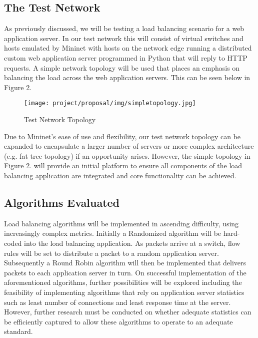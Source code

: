 \subsection{The Test Network}
As previously discussed, we will be testing a load balancing scenario for a web application server. In our test network this will consist of virtual switches and hosts emulated by Mininet with hosts on the network edge running a distributed custom web application server programmed in Python that will reply to HTTP requests. A simple network topology will be used that places an emphasis on balancing the load across the web application servers. This can be seen below in Figure 2.

\begin{figure}[H]
    \centering
    \texttt{[image: project/proposal/img/simpletopology.jpg]} \\[0.2cm]
    \caption{Test Network Topology}
    \label{fig:topology}
\end{figure}

Due to Mininet's ease of use and flexibility, our test network topology can be expanded to encapsulate a larger number of servers or more complex architecture (e.g. fat tree topology) if an opportunity arises. However, the simple topology in Figure 2. will provide an initial platform to ensure all components of the load balancing application are integrated and core functionality can be achieved.     

\subsection{Algorithms Evaluated}
Load balancing algorithms will be implemented in ascending difficulty, using increasingly complex metrics. Initially a Randomized algorithm will be hard-coded into the load balancing application. As packets arrive at a switch, flow rules will be set to distribute a packet to a random application server. Subsequently a Round Robin algorithm will then be implemented that delivers packets to each application server in turn. On successful implementation of the aforementioned algorithms, further possibilities will be explored including the feasibility of implementing algorithms that rely on application server statistics such as least number of connections and least response time at the server. However, further research must be conducted on whether adequate statistics can be efficiently captured to allow these algorithms to operate to an adequate standard. 

